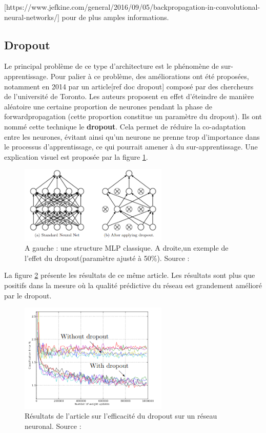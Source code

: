  [https://www.jefkine.com/general/2016/09/05/backpropagation-in-convolutional-neural-networks/] pour de plus amples informations.
 
\subsection{Dropout}

Le principal problème de ce type d'architecture est le phénomène de sur-apprentissage. Pour palier à ce problème, des améliorations ont été proposées, notamment en 2014 par un article[ref doc dropout] composé par des chercheurs de l'université de Toronto. Les auteurs proposent en effet d'éteindre de manière aléatoire une certaine proportion de neurones pendant la phase de forwardpropagation (cette proportion constitue un paramètre du dropout). Ils ont nommé cette technique le \textbf{dropout}. Cela permet de réduire la co-adaptation entre les neurones, évitant ainsi qu'un neurone ne prenne trop d'importance dans le processus d'apprentissage, ce qui pourrait amener à du sur-apprentissage. Une explication visuel est proposée par la figure \ref{dropout}.
 
\begin{figure}[!h]
\centering
\includegraphics[width=200pt]{images/cnn/dropout.png}
\caption{A gauche : une structure MLP classique. A droite,un exemple de l'effet du dropout(paramètre ajusté à 50\%). Source : \cite{srivastava_dropout_nodate} }
\label{dropout}
\end{figure}

La figure \ref{dropout_article} présente les résultats de ce même article. Les résultats sont plus que positifs dans la mesure où la qualité prédictive du réseau est grandement amélioré par le dropout.

\begin{figure}[!h]
\centering
\includegraphics[width=200pt]{images/cnn/dropout_article.png}
\caption{Résultats de l'article sur l'efficacité du dropout sur un réseau neuronal. Source : \cite{srivastava_dropout_nodate} }
\label{dropout_article}
\end{figure}
 
